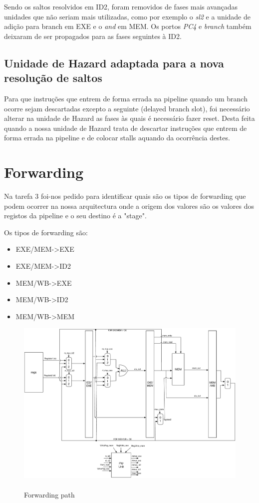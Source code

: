 \documentclass[pdftex,12pt,a4paper]{report}
\begin{document}
Sendo os saltos resolvidos em ID2, foram removidos de fases mais avançadas unidades que não seriam mais utilizadas, como por exemplo o \textit{sl2} e a unidade de adição para branch em EXE e o \textit{and} em MEM. Os portos \textit{PC4} e \textit{branch} também deixaram de ser propagados para as fases seguintes à ID2.

\subsection{Unidade de Hazard adaptada para a nova resolução de saltos}

Para que instruções que entrem de forma errada na pipeline quando um branch ocorre sejam descartadas excepto a seguinte (delayed branch slot), foi necessário alterar na unidade de Hazard as fases às quais é necessário fazer reset. Desta feita quando a nossa unidade de Hazard trata de descartar instruções que entrem de forma errada na pipeline e de colocar stalls aquando da ocorrência destes.

\section{Forwarding}

Na tarefa 3 foi-nos pedido para identificar quais são os tipos de forwarding que podem ocorrer na nossa arquitectura onde a origem dos valores são os valores dos registos da pipeline e o seu destino é a "stage".

Os tipos de forwarding são:
\begin{itemize}
\item EXE/MEM->EXE
\item EXE/MEM->ID2
\item MEM/WB->EXE
\item MEM/WB->ID2
\item MEM/WB->MEM
\end{itemize} 

\newpage

\begin{figure}[!htb]
\center
 \includegraphics[width=150mm,scale=1]{path.pdf}
 \caption{\\ Forwarding path}
 \label{fig:path}
\end{figure}
\end{document}
